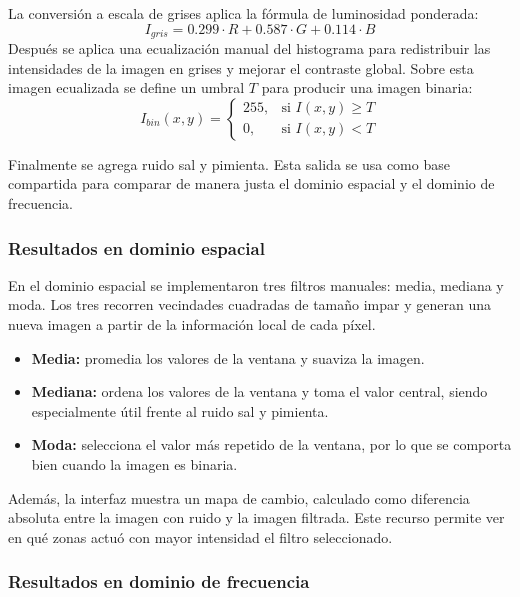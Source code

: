 \documentclass[11pt]{article}
\begin{document}
La conversión a escala de grises aplica la fórmula de luminosidad ponderada:
\begin{equation}
    I_{gris} = 0.299 \cdot R + 0.587 \cdot G + 0.114 \cdot B
    \label{eq:grises}
\end{equation}
Después se aplica una ecualización manual del histograma para redistribuir las intensidades de la imagen en grises y mejorar el contraste global. Sobre esta imagen ecualizada se define un umbral $T$ para producir una imagen binaria:
\begin{equation}
    I_{bin}(x,y)=
    \begin{cases}
        255, & \text{si } I(x,y)\geq T \\
        0, & \text{si } I(x,y)<T
    \end{cases}
    \label{eq:binaria}
\end{equation}

Finalmente se agrega ruido sal y pimienta. Esta salida se usa como base compartida para comparar de manera justa el dominio espacial y el dominio de frecuencia.

\subsubsection{Resultados en dominio espacial}

En el dominio espacial se implementaron tres filtros manuales: media, mediana y moda. Los tres recorren vecindades cuadradas de tamaño impar y generan una nueva imagen a partir de la información local de cada píxel.

\begin{itemize}
    \item \textbf{Media:} promedia los valores de la ventana y suaviza la imagen.
    \item \textbf{Mediana:} ordena los valores de la ventana y toma el valor central, siendo especialmente útil frente al ruido sal y pimienta.
    \item \textbf{Moda:} selecciona el valor más repetido de la ventana, por lo que se comporta bien cuando la imagen es binaria.
\end{itemize}

Además, la interfaz muestra un mapa de cambio, calculado como diferencia absoluta entre la imagen con ruido y la imagen filtrada. Este recurso permite ver en qué zonas actuó con mayor intensidad el filtro seleccionado.

\subsubsection{Resultados en dominio de frecuencia}
\end{document}
